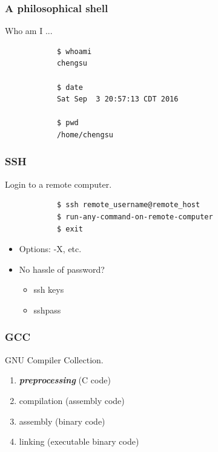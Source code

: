 \documentclass{beamer}
\begin{document}
	\begin{frame}[fragile]
		\frametitle{A philosophical shell}
		Who am I ...
		\begin{center}
		\begin{verbatim}
			$ whoami
			chengsu

			$ date
			Sat Sep  3 20:57:13 CDT 2016

			$ pwd
			/home/chengsu 
		\end{verbatim}
		\end{center}	
	\end{frame}

	\begin{frame}[fragile]
		\frametitle{SSH}
		Login to a remote computer.
		\begin{center}
		\begin{verbatim}
			$ ssh remote_username@remote_host
			$ run-any-command-on-remote-computer
			$ exit
    \end{verbatim}
		\end{center}
		\begin{itemize}
      \item Options: -X, etc.
			\item No hassle of password? \\
			\begin{itemize}
				\item ssh keys
				\item sshpass
			\end{itemize}	
		\end{itemize}
	\end{frame}

  \begin{frame}
    \frametitle{GCC}
    GNU Compiler Collection.

		\begin{enumerate}
      \item \textbf{\textit{preprocessing}} (C code) 
      \item compilation (assembly code)
			\item assembly (binary code)
			\item linking (executable binary code)
    \end{enumerate}
  \end{frame}
\end{document}
